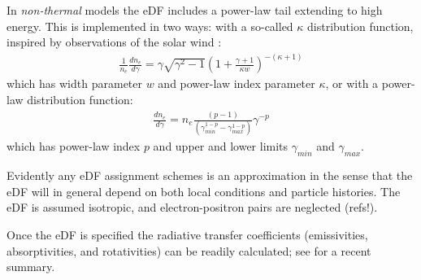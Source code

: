 In {\it non-thermal} models the eDF includes a power-law tail extending to high energy.   This is implemented in two ways: with a so-called $\kappa$ distribution function, inspired by observations of the solar wind :
\begin{align}                                           \frac{1}{n_e} \frac{d n_e}{d\gamma}= \gamma \sqrt{\gamma^2-1} \left(1+\frac{\gamma+1}{\kappa w}\right)^{-(\kappa+1)}           \end{align}
which has width parameter $w$ and power-law index parameter $\kappa$, or with a power-law distribution function:
\begin{align}
\frac{d n_e}{d\gamma} = n_e \frac{ (p-1)}{(\gamma_{min}^{1-p} - \gamma_{max}^{1-p})} \gamma^{-p}
\end{align}
which has power-law index $p$ and upper and lower limits  $\gamma_{min}$ and $\gamma_{max}$.

Evidently any eDF assignment schemes is an approximation in the sense that the eDF will in general depend on both local conditions and particle histories.  The eDF is assumed isotropic, and electron-positron pairs are neglected (refs!).

Once the eDF is specified the radiative transfer coefficients (emissivities, absorptivities, and rotativities) can be readily calculated; see \cite{2021ApJ...921...17M} for a recent summary.




